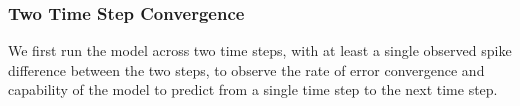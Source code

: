 \documentclass[11pt]{article}
\begin{document}
\subsubsection{Two Time Step Convergence}
We first run the model across two time steps, with at least a single observed spike difference between the two steps, to observe the rate of error convergence and capability of the model to predict from a single time step to the next time step.

\begin{figure}[H]
\begin{minipage}{0.49\linewidth}
\end{minipage}
\begin{minipage}{0.5\linewidth}
\end{minipage}


\end{figure}
\end{document}
